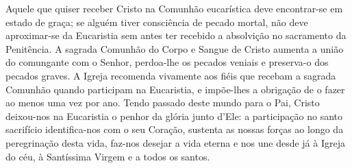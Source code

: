 Aquele que quiser receber Cristo na Comunhão eucarística deve encontrar-se em estado de graça; se alguém tiver consciência de pecado mortal, não deve aproximar-se da Eucaristia sem antes ter recebido a absolvição no sacramento da Penitência. A sagrada Comunhão do Corpo e Sangue de Cristo aumenta a união do comungante com o Senhor, perdoa-lhe os pecados veniais e preserva-o dos pecados graves. A Igreja recomenda vivamente aos fiéis que recebam a sagrada Comunhão quando participam na Eucaristia, e impõe-lhes a obrigação de o fazer ao menos uma vez por ano. Tendo passado deste mundo para o Pai, Cristo deixou-nos na Eucaristia o penhor da glória junto d'Ele: a participação no santo sacrifício identifica-nos com o seu Coração, sustenta as nossas forças ao longo da peregrinação desta vida, faz-nos desejar a vida eterna e nos une desde já à Igreja do céu, à Santíssima Virgem e a todos os santos.
